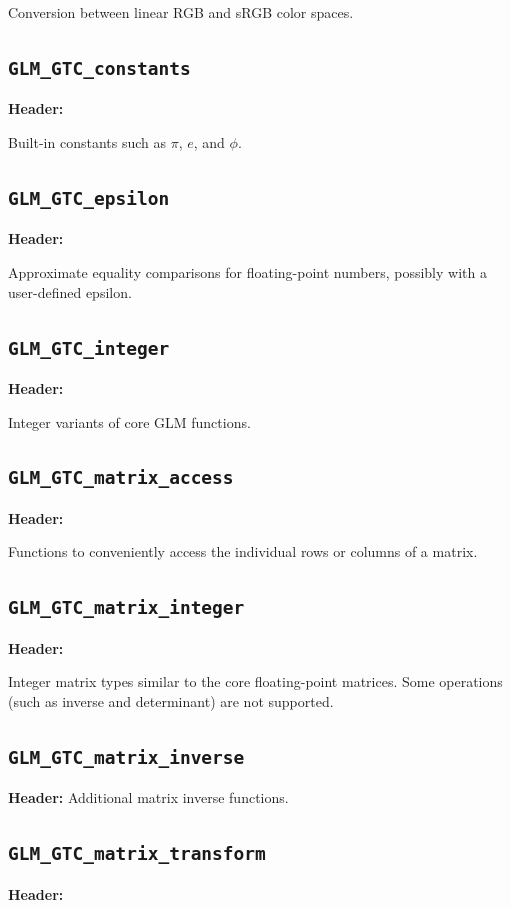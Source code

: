 \documentclass{scrartcl}
\numberwithin{figure}{subsection}
\begin{document}
Conversion between linear RGB and sRGB color spaces.

\subsection{\texttt{GLM\_GTC\_constants}}
\textbf{Header:} 

Built-in constants such as $\pi$, $e$, and $\phi$.

\subsection{\texttt{GLM\_GTC\_epsilon}}
\textbf{Header:} 

Approximate equality comparisons for floating-point numbers, possibly with a user-defined epsilon.

\subsection{\texttt{GLM\_GTC\_integer}}
\textbf{Header:} 

Integer variants of core GLM functions. 

\subsection{\texttt{GLM\_GTC\_matrix\_access}}
\textbf{Header:} 

Functions to conveniently access the individual rows or columns of a matrix.

\subsection{\texttt{GLM\_GTC\_matrix\_integer}}
\textbf{Header:} 

Integer matrix types similar to the core floating-point matrices.  Some operations (such as inverse and determinant) are not supported.

\subsection{\texttt{GLM\_GTC\_matrix\_inverse}}
\textbf{Header:} 
Additional matrix inverse functions. 

\subsection{\texttt{GLM\_GTC\_matrix\_transform}}
\textbf{Header:} 
\end{document}
